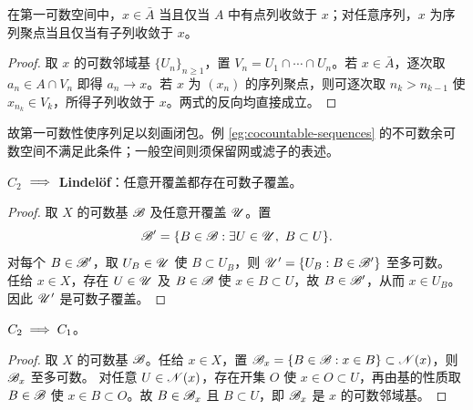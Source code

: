 \begin{theorem}
    在第一可数空间中，$x\in\bar A$ 当且仅当 $A$ 中有点列收敛于 $x$；对任意序列，$x$ 为序列聚点当且仅当有子列收敛于 $x$。
\end{theorem}
\begin{proof}
    取 $x$ 的可数邻域基 $\{U_n\}_{n\geqslant1}$，置 $V_n=U_1\cap\cdots\cap U_n$。若 $x\in\bar A$，逐次取 $a_n\in A\cap V_n$ 即得 $a_n\to x$。若 $x$ 为 $(x_n)$ 的序列聚点，则可逐次取 $n_k>n_{k-1}$ 使 $x_{n_k}\in V_k$，所得子列收敛于 $x$。两式的反向均直接成立。
\end{proof}

故第一可数性使序列足以刻画闭包。例 \ref{eg:cocountable-sequences} 的不可数余可数空间不满足此条件；一般空间则须保留网或滤子的表述。

\begin{theorem}
    $C_2$ $\implies$ \textbf{Lindel\"of}：任意开覆盖都存在可数子覆盖。
\end{theorem}

\begin{proof}
    取 $X$ 的可数基 $\mathscr B$ 及任意开覆盖 $\mathscr U$。置
    \[
        \topo B'=\{B\in\topo B:\exists U\in\topo U,\ B\subset U\}.
    \]
    对每个 $B\in\mathscr B'$，取 $U_B\in\mathscr U$ 使 $B\subset U_B$，则 $\mathscr U'=\{U_B:B\in\mathscr B'\}$ 至多可数。
    任给 $x\in X$，存在 $U\in\mathscr U$ 及 $B\in\mathscr B$ 使 $x\in B\subset U$，故 $B\in\mathscr B'$，从而 $x\in U_B$。因此 $\mathscr U'$ 是可数子覆盖。
\end{proof}

\begin{theorem}
    $C_2 \implies C_1$。
\end{theorem}

\begin{proof}
    取 $X$ 的可数基 $\mathscr B$。任给 $x\in X$，置 $\mathscr B_x=\{B\in\mathscr B:x\in B\}\subset\mathscr N(x)$，则 $\mathscr B_x$ 至多可数。
    对任意 $U\in\mathscr N(x)$，存在开集 $O$ 使 $x\in O\subset U$，再由基的性质取 $B\in\mathscr B$ 使 $x\in B\subset O$。故 $B\in\mathscr B_x$ 且 $B\subset U$，即 $\mathscr B_x$ 是 $x$ 的可数邻域基。
\end{proof}

